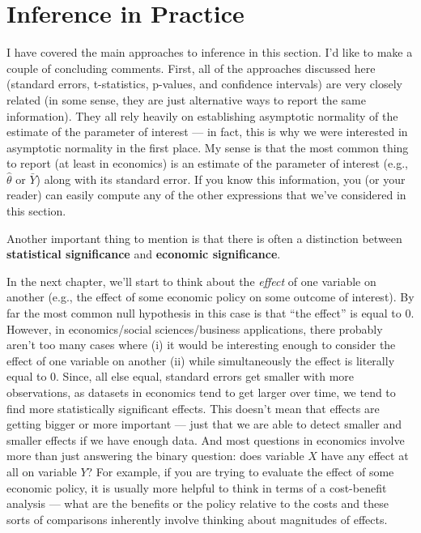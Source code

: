 \documentclass[
  letterpaper,
  DIV=11,
  numbers=noendperiod]{scrreprt}
\begin{document}
\section{Inference in Practice}\label{inference-in-practice}

I have covered the main approaches to inference in this section. I'd
like to make a couple of concluding comments. First, all of the
approaches discussed here (standard errors, t-statistics, p-values, and
confidence intervals) are very closely related (in some sense, they are
just alternative ways to report the same information). They all rely
heavily on establishing asymptotic normality of the estimate of the
parameter of interest --- in fact, this is why we were interested in
asymptotic normality in the first place. My sense is that the most
common thing to report (at least in economics) is an estimate of the
parameter of interest (e.g., \(\hat{\theta}\) or \(\bar{Y}\)) along with
its standard error. If you know this information, you (or your reader)
can easily compute any of the other expressions that we've considered in
this section.

Another important thing to mention is that there is often a distinction
between \textbf{statistical significance} and \textbf{economic
significance}.

In the next chapter, we'll start to think about the \emph{effect} of one
variable on another (e.g., the effect of some economic policy on some
outcome of interest). By far the most common null hypothesis in this
case is that ``the effect'' is equal to 0. However, in economics/social
sciences/business applications, there probably aren't too many cases
where (i) it would be interesting enough to consider the effect of one
variable on another (ii) while simultaneously the effect is literally
equal to 0. Since, all else equal, standard errors get smaller with more
observations, as datasets in economics tend to get larger over time, we
tend to find more statistically significant effects. This doesn't mean
that effects are getting bigger or more important --- just that we are
able to detect smaller and smaller effects if we have enough data. And
most questions in economics involve more than just answering the binary
question: does variable \(X\) have any effect at all on variable \(Y\)?
For example, if you are trying to evaluate the effect of some economic
policy, it is usually more helpful to think in terms of a cost-benefit
analysis --- what are the benefits or the policy relative to the costs
and these sorts of comparisons inherently involve thinking about
magnitudes of effects.
\end{document}
